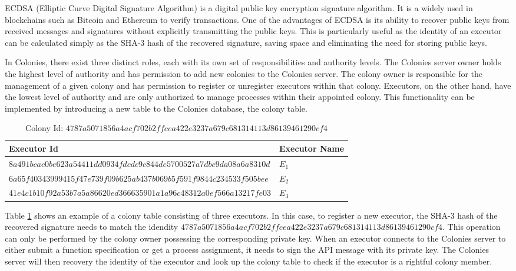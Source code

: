 \documentclass{article}
\begin{document}
ECDSA (Elliptic Curve Digital Signature Algorithm) \cite{ecdsa} is a digital public key encryption signature algorithm. It is a widely used in blockchains such as Bitcoin and Ethereum to verify transactions. One of the advantages of ECDSA is its ability to recover public keys from received messages and signatures without explicitly transmitting the public keys. This is particularly useful as the identity of an executor can be calculated simply as the SHA-3 hash of the recovered signature, saving space and eliminating the need for storing public keys. 

In Colonies, there exist three distinct roles, each with its own set of responsibilities and authority levels. The Colonies server owner holds the highest level of authority and has permission to add new colonies to the Colonies server. The colony owner is responsible for the management of a given colony and has permission to register or unregister executors within that colony. Executors, on the other hand, have the lowest level of authority and are only authorized to manage processes within their appointed colony. This functionality can be implemented by introducing a new table to the Colonies database, the colony table.

\begin{table}[h]
    \caption{Colony Id: \(4787a5071856a4acf702b2ffcea422e3237a679c681314113d86139461290cf4\)}
	\centering
	\begin{tabular}{ll}
		\toprule
		\cmidrule(r){1-2}
        Executor Id & Executor Name \\
		\midrule
        \(8a491bcac0be623a54411dd0934fdcdc9c844de5700527a7dbc9da08a6a8310d\) & $E_{1}$ \\
        \(6a65f40343999415f47e739f09b625ab437b069b5f591f9844c234533f505bee\) & $E_{2}$ \\
        \(41e4c1b10f92a53b7a5a86620ed366635901a1a96c48312a0ef566a13217fe03\) & $E_{3}$ \\
		\bottomrule
	\end{tabular}
	\label{coltable}
\end{table}

Table \ref{coltable} shows an example of a colony table consisting of three executors. In this case, to register a new executor, the SHA-3 hash of the recovered signature needs to match the idendity \(4787a5071856a4acf702b2ffcea422e3237a679c681314113d86139461290cf4\). This operation can only be performed by the colony owner possessing the corresponding private key. When an executor connects to the Colonies server to either submit a function specification or get a process assignment, it needs to sign the API message with its private key. The Colonies server will then recovery the identity of the executor and look up the colony table to check if the executor is a rightful colony member.
\end{document}
